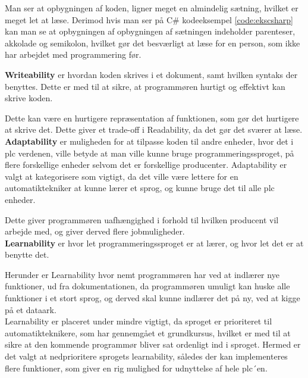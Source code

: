 
\noindent Man ser at opbygningen af koden, ligner meget en almindelig sætning, hvilket er meget let at læse. Derimod hvis man ser på C\# kodeeksempel \ref{code:ekscsharp} kan man se at opbygningen af opbygningen af sætningen indeholder parenteser, akkolade og semikolon, hvilket gør det besværligt at læse for en person, som ikke har arbejdet med programmering før.





\noindent\textbf{Writeability} er hvordan koden skrives i et dokument, samt hvilken syntaks der benyttes. Dette er med til at sikre, at programmøren hurtigt og effektivt kan skrive koden.

Dette kan være en hurtigere repræsentation af funktionen, som gør det hurtigere at skrive det. Dette giver et trade-off i Readability, da det gør det sværer at læse.\\

\noindent\textbf{Adaptability} er muligheden for at tilpasse koden til andre enheder, hvor det i \gls{plc} verdenen, ville betyde at man ville kunne bruge programmeringssproget, på flere forskellige enheder selvom det er forskellige producenter. Adaptability er valgt at kategorisere som vigtigt, da det ville være lettere for en automatiktekniker at kunne lærer et sprog, og kunne bruge det til alle \gls{plc} enheder.

Dette giver programmøren uafhængighed i forhold til hvilken producent vil arbejde med, og giver derved flere jobmuligheder.\\

\noindent\textbf{Learnability} er hvor let programmeringssproget er at lærer, og hvor let det er at benytte det.

Herunder er Learnability hvor nemt programmøren har ved at indlærer nye funktioner, ud fra dokumentationen, da programmøren umuligt kan huske alle funktioner i et stort sprog, og derved skal kunne indlærer det på ny, ved at kigge på et dataark. \\
Learnability er placeret under mindre vigtigt, da sproget er prioriteret til automatikteknikere, som har gennemgået et grundkursus, hvilket er med til at sikre at den kommende programmør bliver sat ordenligt ind i sproget. Hermed er det valgt at nedprioritere sprogets learnability, således der kan implementeres flere funktioner, som giver en rig mulighed for udnyttelse af hele \gls{plc}´en.\\

